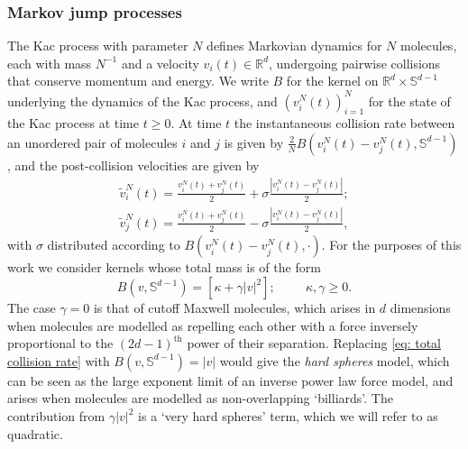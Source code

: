 \documentclass[11pt, notitlepage]{article}
\begin{document}
\subsubsection{\textbf{Markov jump processes}}\label{s:jump_procs}
The Kac process with parameter $N$ defines Markovian dynamics for $N$ molecules, each with mass $N^{-1}$ and a velocity $v_i(t)\in\mathbb{R}^d$, undergoing pairwise collisions that conserve momentum and energy. We write $B$ for the kernel on $\mathbb{R}^d \times \mathbb{S}^{d-1}$ underlying the dynamics of the Kac process, and $\left(v_i^N(t)\right)_{i=1}^N$ for the state of the Kac process at time $t\ge 0$.
At time $t$ the instantaneous collision rate between an unordered pair of molecules $i$ and $j$ is given by $\frac2NB(v_i^N(t) - v_j^N(t), \mathbb{S}^{d-1})$, and the post-collision velocities are given by 
\begin{align}
    \widetilde{v}_i^N(t)=\frac{v_i^N(t) + v_j^N(t)}{2} + \sigma \frac{|v_i^N(t) - v_j^N(t)|}{2};
\\   \widetilde{v}_j^N(t)=\frac{v_i^N(t) + v_j^N(t)}{2} - \sigma \frac{|v_i^N(t) - v_j^N(t)|}{2},
\end{align}
with $\sigma$ distributed according to $B(v_i^N(t) - v_j^N(t), \cdot)$.
For the purposes of this work we consider kernels whose total mass is of the form
\begin{equation} \label{eq: total collision rate}
    B(v, \mathbb{S}^{d-1}) =
  \left[\kappa + \gamma |v|^2 \right];
    \hspace{1cm} \kappa,\gamma \geq 0.
\end{equation}
The case $\gamma = 0$ is that of cutoff Maxwell molecules, which arises in $d$ dimensions when molecules are modelled as repelling each other with a force inversely proportional to the $(2d-1)^\mathrm{th}$ power of their separation.
Replacing \ref{eq: total collision rate} with $B(v, \mathbb{S}^{d-1}) =  |v|$ would give the \emph{hard spheres} model, which can be seen as the large exponent limit of an inverse power law force model, and arises when molecules are modelled as non-overlapping `billiards'.
The contribution from $\gamma |v|^2$ is a `very hard spheres' term, which we will refer to as quadratic.
\end{document}
